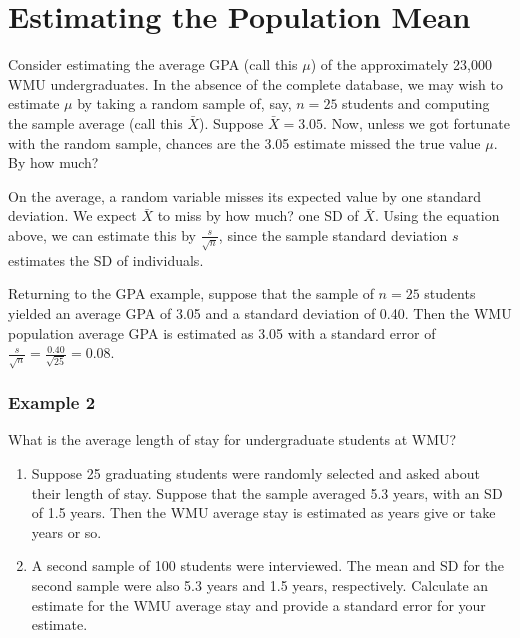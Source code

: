 \documentclass[11pt, chapterprefix=true]{scrbook}\usepackage[]{graphicx}\usepackage[]{color}
\begin{document}
\section{Estimating the Population Mean}

Consider estimating the average GPA (call this $\mu$) of the approximately 23,000 WMU undergraduates.  In the absence of the complete database, we may wish to estimate $\mu$ by taking a random sample of, say, $n = 25$ students and computing the sample average (call this $\bar{X}$).  Suppose $\bar{X} = 3.05$.  Now, unless we got fortunate with the random sample, chances are the 3.05 estimate missed the true value $\mu$.  By how much?

On the average, a random variable misses its expected value by one standard deviation.  We expect $\bar{X}$ to miss by how much?  one SD of $\bar{X}$.  Using the equation above, we can estimate this by $\frac{s}{\sqrt{n}}$, since the sample standard deviation $s$ estimates the SD of individuals.


Returning to the GPA example, suppose that the sample of $n = 25$ students yielded an average GPA of 3.05 and a standard deviation of 0.40.  Then the WMU population average GPA is estimated as 3.05 with a standard error of $\frac{s}{\sqrt{n}} = \frac{0.40}{\sqrt{25}} = 0.08$.

\subsubsection{Example 2}

What is the average length of stay for undergraduate students at WMU?

\begin{enumerate}
  \item Suppose 25 graduating students were randomly selected and asked about their length of stay.  Suppose that the sample averaged 5.3 years, with an SD of 1.5 years.  Then the WMU average stay is estimated as \underline{\phantom{xxxxxxxx}}  years give or take \underline{\phantom{xxxxxxxx}} years or so. 

  \item A second sample of 100 students were interviewed.   The mean and SD for the second sample were also 5.3 years and 1.5 years, respectively. Calculate an estimate for the WMU average stay and provide a standard error for your estimate.
\end{enumerate}
\end{document}

